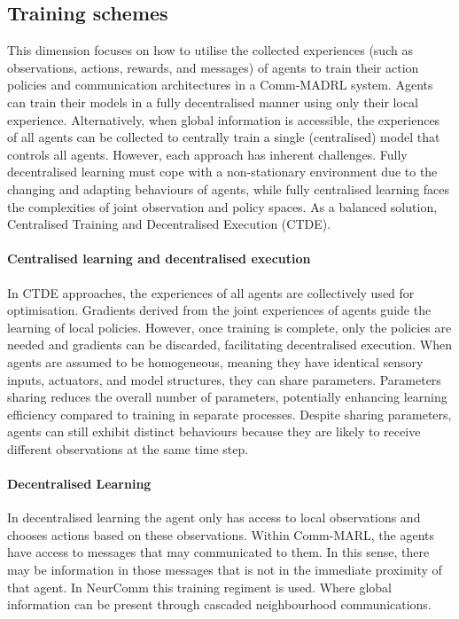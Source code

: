 \documentclass{article}
\begin{document}
\subsection{Training schemes}

This dimension focuses on how to utilise the collected experiences (such as observations, actions, rewards, and messages) of agents to train their action policies and communication architectures in a Comm-MADRL system. Agents can train their models in a fully decentralised manner using only their local experience. Alternatively, when global information is accessible, the experiences of all agents can be collected to centrally train a single (centralised) model that controls all agents. However, each approach has inherent challenges. Fully decentralised learning must cope with a non-stationary environment due to the changing and adapting behaviours of agents, while fully centralised learning faces the complexities of joint observation and policy spaces. As a balanced solution, Centralised Training and Decentralised Execution (CTDE). 

\paragraph{Centralised learning and decentralised execution} In CTDE approaches, the experiences of all agents are collectively used for optimisation. Gradients derived from the joint experiences of agents guide the learning of local policies. However, once training is complete, only the policies are needed and gradients can be discarded, facilitating decentralised execution. When agents are assumed to be homogeneous, meaning they have identical sensory inputs, actuators, and model structures, they can share parameters. Parameters sharing reduces the overall number of parameters, potentially enhancing learning efficiency compared to training in separate processes. Despite sharing parameters, agents can still exhibit distinct behaviours because they are likely to receive different observations at the same time step.


\paragraph{Decentralised Learning} In decentralised learning the agent only has access to local observations and chooses actions based on these observations. Within Comm-MARL, the agents have access to messages that may communicated to them. In this sense, there may be information in those messages that is not in the immediate proximity of that agent. In NeurComm \citep{chu2020NeurComm} this training regiment is used. Where global information can be present through cascaded neighbourhood communications.
\end{document}
